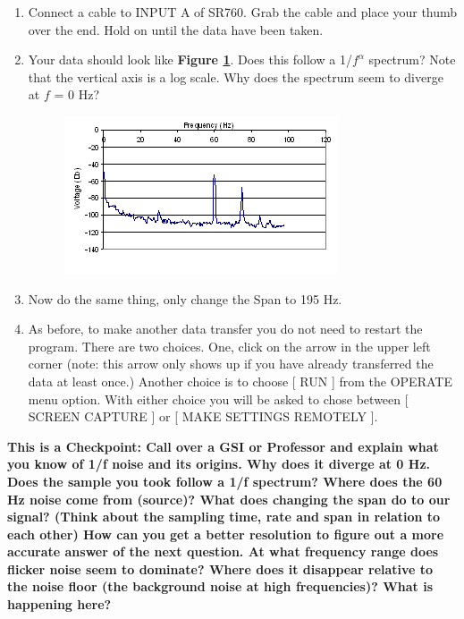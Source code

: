 \documentclass{../lab}
\begin{document}
\begin{enumerate}
\begin{enumerate}
    \end{enumerate}

    \item Connect a cable to INPUT A of SR760. Grab the cable and place your thumb over the end. Hold on until the data have been taken.

    \item Your data should look like \textbf{Figure \ref{fig:LLSimage019}}. Does this follow a 1/$f^\alpha$ spectrum? Note that the vertical axis is a log scale. Why does the spectrum seem to diverge at $f$ = 0 Hz?
    \begin{figure}[h]
        \centering
        \href{http://experimentationlab.berkeley.edu/sites/default/files/images/LLSimage019.gif}{\includegraphics[width=0.5\linewidth]{images/LLSimage019.png}}
        \caption{}
        \label{fig:LLSimage019}
    \end{figure}

    \item Now do the same thing, only change the Span to 195 Hz.

    \item As before, to make another data transfer you do not need to restart the program. There are two choices. One, click on the arrow in the upper left corner (note: this arrow only shows up if you have already transferred the data at least once.) Another choice is to choose [ RUN ] from the OPERATE menu option. With either choice you will be asked to chose between [ SCREEN CAPTURE ] or [ MAKE SETTINGS REMOTELY ].

\end{enumerate}


\textbf{This is a Checkpoint: Call over a GSI or Professor and explain what you know of 1/f noise and its origins. Why does it diverge at 0 Hz. Does the sample you took follow a 1/f spectrum? Where does the 60 Hz noise come from (source)? What does changing the span do to our signal? (Think about the sampling time, rate and span in relation to each other) How can you get a better resolution to figure out a more accurate answer of the next question. At what frequency range does flicker noise seem to dominate? Where does it disappear relative to the noise floor (the background noise at high frequencies)? What is happening here? }
\end{document}
